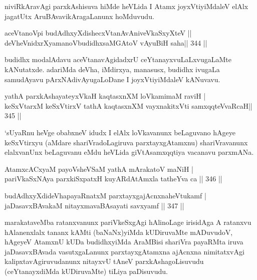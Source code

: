 \begin{artha}
niviRkAravAgi parxkAshisuva hiMde heVLida I Atamx joyxVtiyiMdaleV elAlx jagatUtx AruBAvavikAragaLanunx hoMduvudu.
\end{artha}


\begin{shl}
aceVtanoV\s pi budAdhxyXdishecxVtanAvAniveVkaSxyXteV ||  \\
deVheVnidxrXyamanoVbudidhxsaMGAtoV vAyuBiH saha\hfill ||  344 ||  
\end{shl}

\begin{artha}
budidhx modalAdavu aceVtanavAgidadxrU ceYtanayxvuLaLxvugaLaMte kANutatxde. adariMda deVha, iMdirxya, manasusx, budidhx ivugaLa samudAyavu pArxNAdivAyugaLoDane I joyxVtiyiMdaleV kANuvavu.
\end{artha}


\begin{shl}
yathA parxkAshayateyxVkaH kaqtasxnXM loVkamimaM raviH | \\
keSxVtarxM keSxVtirxV tathA kaqtasxnXM vayxnakitxVti samxqqteVvaRcaH\hfill ||  345 ||  
\end{shl}

\begin{artha}
`sUyaRnu heVge obabxneV idudx I elAlx loVkavanunx beLaguvano hAgeye keSxVtirxyu (aMdare shariVradoLagiruva parxtayxgAtamxnu) shariVravanunx elalxvanUnx beLaguvanu eMdu heVLida giVtAsamxqqtiya vacanavu parxmANa.
\end{artha}


\begin{shl}
AtamxcACxyaM payoV\s sheVSaM yathA mArakatoV maNiH | \\
pariVkaSxNAya parxkiSxpatxH kuyARdAtAmxla tatheYva ca \hfill||  346 ||  
\end{shl}
				
\begin{shl}
budAdhxyXdideVhapayaRnatxM parxtayxgajAcnxnaheVtukamf | \\
jaDasavxBAvakaM nitayxmavaBAsayati savxyamf \hfill||  347 ||  
\end{shl}

\begin{artha}
marakataveMba ratanxvanunx pariVkeSxgAgi hAlinoLage irisidAga A ratanxvu hAlanenxlalx tananx kAMti (baNaNx)yiMda kUDiruvaMte mADuvudoV, hAgeyeV AtamxnU kUDa budidhxyiMda AraMBisi shariVra payaRMta iruva jaDasavxBAvada vasutxgaLanunx parxtayxgAtamxna ajAcnxna nimitatxvAgi kalipxtavAgiruvudanunx nitayxvU tAneV parxkAshagoLisuvudu (ceYtanayxdiMda kUDiruvaMte) tiLiya paDisuvudu.
\end{artha}

